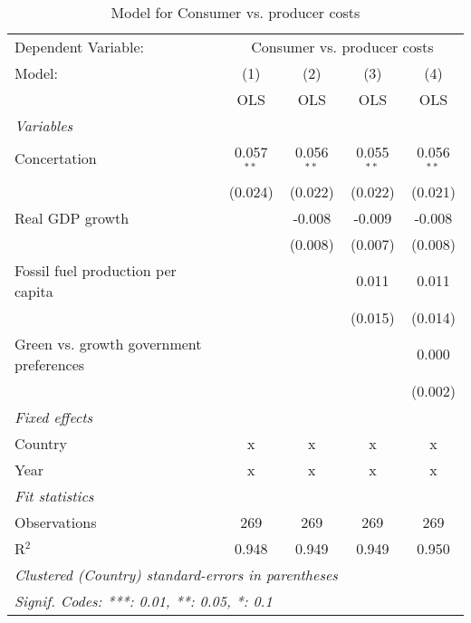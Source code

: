 
\begin{table}[htbp]
   \caption{Model for Consumer vs. producer costs}
   \centering
   \begin{tabular}{lcccc}
      \toprule
      Dependent Variable: & \multicolumn{4}{c}{Consumer vs. producer costs}\\
      Model:                                  & (1)          & (2)          & (3)          & (4)\\  
                                              &  OLS         & OLS          & OLS          & OLS\\  
      \midrule
      \emph{Variables}\\
      Concertation                            & 0.057$^{**}$ & 0.056$^{**}$ & 0.055$^{**}$ & 0.056$^{**}$\\   
                                              & (0.024)      & (0.022)      & (0.022)      & (0.021)\\   
      Real GDP growth                         &              & -0.008       & -0.009       & -0.008\\   
                                              &              & (0.008)      & (0.007)      & (0.008)\\   
      Fossil fuel production per capita       &              &              & 0.011        & 0.011\\   
                                              &              &              & (0.015)      & (0.014)\\   
      Green vs. growth government preferences &              &              &              & 0.000\\   
                                              &              &              &              & (0.002)\\   
      \emph{Fixed effects}\\
      Country                                 & x            & x            & x            & x\\  
      Year                                    & x            & x            & x            & x\\  
      \midrule \emph{Fit statistics}\\
      Observations                            & 269          & 269          & 269          & 269\\  
      R$^2$                                   & 0.948        & 0.949        & 0.949        & 0.950\\  
      \midrule
      \multicolumn{5}{l}{\emph{Clustered (Country) standard-errors in parentheses}}\\
      \multicolumn{5}{l}{\emph{Signif. Codes: ***: 0.01, **: 0.05, *: 0.1}}\\
   \end{tabular}
\end{table}


